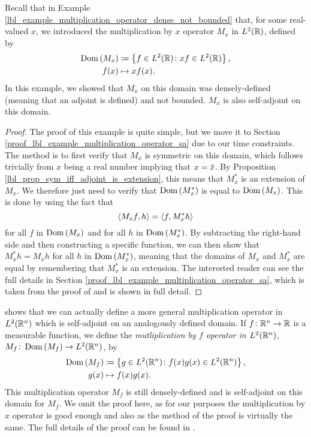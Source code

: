 \begin{example}\label{lbl_example_multiplication_operator_sa}
  Recall that in Example \eqref{lbl_example_multiplication_operator_dense_not_bounded} that, for some real-valued $x$, we introduced the multiplication by $x$ operator $M_x$ in $L^2(\mathbb{R})$, defined by
  \begin{align*}
    \operatorname{Dom}\left(M_x\right) &\coloneqq  \left\{f \in L^2(\mathbb{R}) \colon xf \in L^2(\mathbb{R})\right\}, \\
    f(x) &\mapsto xf(x).
  \end{align*}
  In this example, we showed that $M_x$ on this domain was densely-defined (meaning that an adjoint is defined) and not bounded. $M_x$ is also self-adjoint on this domain.
\end{example}
\begin{proof}
  The proof of this example is quite simple, but we move it to Section \eqref{proof_lbl_example_multiplication_operator_sa} due to our time constraints. The method is to first verify that $M_x$ is symmetric on this domain, which follows trivially from $x$ being a real number implying that $x = \conjugate{x}$. By Proposition \eqref{lbl_prop_sym_iff_adjoint_is_extension}, this means that $M_x^*$ is an extension of $M_x$. We therefore just need to verify that $\operatorname{Dom}\left(M_x^*\right)$ is equal to $\operatorname{Dom}\left(M_x\right)$. This is done by using the fact that
  \begin{equation*}
    \left\langle M_x f, h\right\rangle = \left\langle f, M_x^* h\right\rangle
  \end{equation*}
  for all $f$ in $\operatorname{Dom}\left(M_x\right)$ and for all $h$ in $\operatorname{Dom}\left(M_x^*\right)$. By subtracting the right-hand side and then constructing a specific function, we can then show that $M_x^* h = M_x h$ for all $h$ in $\operatorname{Dom}\left(M_x^*\right)$, meaning that the domains of $M_x$ and $M_x^*$ are equal by remembering that $M_x^*$ is an extension. The interested reader can see the full details in Section \eqref{proof_lbl_example_multiplication_operator_sa}, which is taken from the proof of {\cite[Theorem 10.7-2]{kreyszig}} and is shown in full detail.
\end{proof}

\begin{remark}
  {\cite[Proposition 9.30]{Hall2013}} shows that we can actually define a more general multiplication operator in $L^2(\mathbb{R}^n)$ which is self-adjoint on an analogously defined domain. If $f \colon \mathbb{R}^n \to \mathbb{R}$ is a measurable function, we define the {\emph{mutliplication by $f$ operator in $L^2(\mathbb{R}^n)$}}, $M_f \colon \operatorname{Dom}\left(M_f\right) \to L^2(\mathbb{R}^n)$, by
  \begin{align*}
    \operatorname{Dom}\left(M_f\right) &\coloneqq  \left\{g \in L^2(\mathbb{R}^n) \colon f(x)g(x) \in L^2(\mathbb{R}^n)\right\}, \\
    g(x) &\mapsto f(x)g(x).
  \end{align*}
  This multiplication operator $M_f$ is still densely-defined and is self-adjoint on this domain for $M_f$. We omit the proof here, as for our purposes the multiplication by $x$ operator is good enough and also as the method of the proof is virtually the same. The full details of the proof can be found in {\cite[Proposition 9.30]{Hall2013}}.
\end{remark}

